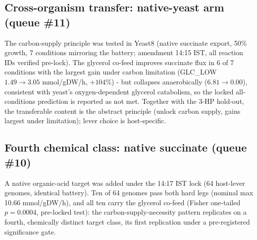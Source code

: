 \documentclass[12pt,a4paper]{article}
\begin{document}
\subsection{Cross-organism transfer: native-yeast arm (queue \#11)}
The carbon-supply principle was tested in Yeast8 (native succinate export, 50\% growth, 7 conditions mirroring the battery; amendment 14:15 IST, all reaction IDs verified pre-lock). The glycerol co-feed improves succinate flux in 6 of 7 conditions with the largest gain under carbon limitation (GLC\_LOW $1.49 \to 3.05$ mmol/gDW/h, $+104\%$) - but collapses anaerobically ($6.81 \to 0.00$), consistent with yeast's oxygen-dependent glycerol catabolism, so the locked all-conditions prediction is reported as not met. Together with the 3-HP hold-out, the transferable content is the abstract principle (unlock carbon supply, gains largest under limitation); lever choice is host-specific.

\subsection{Fourth chemical class: native succinate (queue \#10)}
A native organic-acid target was added under the 14:17 IST lock (64 host-lever genomes, identical battery). Ten of 64 genomes pass both hard legs (nominal max 10.66 mmol/gDW/h), and all ten carry the glycerol co-feed (Fisher one-tailed $p=0.0004$, pre-locked test): the carbon-supply-necessity pattern replicates on a fourth, chemically distinct target class, its first replication under a pre-registered significance gate.


\appendix
\end{document}
